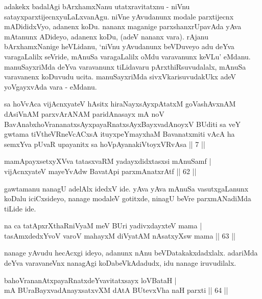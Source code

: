 \begin{artha}
adakekx badalAgi bArxhamxNanu utatxravitatxnu - niVnu 
satayxparxtijecnxyuLaLxvanAgu. niVne yAvudanunx modale parxtijecnx 
mADididxVyo, adanenx koDu. nananx maganige parxshanxrUpavAda yAva 
mAtanunx ADideyo, adanenx koDu, (adeV nananx vara). rAjanu 
bArxhamxNanige heVLidanu, `niVnu yAvudanunx beVDuveyo adu deYva 
varagaLalilx seVride, mAnuSa varagaLalilx oMdu varavanunx keVLu' 
eMdanu. manuSayxriMda deYva varavanunx tiLidavaru pArxthiRsuvudalalx, 
mAnuSa varavanenx koDuvudu ucita. manuSayxriMda sivxVkarisuvudakUkx 
adeV yoVgayxvAda vara - eMdanu.
\end{artha}


\begin{shl}
sa hoVvAca vijAcnxyateV hAsitx hiraNayxsAyxpAtatxM goVashAvxnAM dAsiVnAM parxvArANAM paridAnasayx mA noV BavAnabxhoVrananatxsAyxpayaRnatxsAyxBayxvadAnoyxV BUditi sa veY gwtama tiVtheVRneVcACxsA ituyxpeYmayxhaM Bavanatxmiti vAcA ha semxYva pUvaR upayanitx sa hoVpAyanakiVtoyxVRvAsa || 7 ||
\end{shl}

\begin{shl}
mamApayxsetxyXVva tatasxvaRM yadayxdidxtasxsi mAnuSamf | \\
vijAcnxyateV mayeYvA\s \s dw BavatA\s pi parxmAnatxrAtf \hfill|| 62 || 
\end{shl}

\begin{artha}
gawtamanu nanagU adelAlx idedxV ide. yAva yAva mAnuSa vasutxgaLanunx 
koDalu iciCxsideyo, nanage modaleV gotitxde, ninagU beVre parxmANadiMda 
tiLide ide.
\end{artha}

\begin{shl}
na ca tatApxrXthaRniVyaM meV BUri yadivxdayxteV mama | \\
tasAmxdedxYvoV varoV mahayxM diVyatAM nAsatxyXsw mama \hfill|| 63 || 
\end{shl}

\begin{artha}
nanage yAvudu hecAcxgi ideyo, adanunx nAnu beVDatakakxdadxlalx. adariMda deYva varavaneVnx nanagAgi koDabeVkAdadudx, idu nanage iruvudilalx.
\end{artha}


\begin{shl}
bahoVrananAtxpayaRnatxdeYvavitatxsayx loVBataH | \\
mA BUraBayxvadAnayxsatxvXM dAtA BUtevxVha naH parxti \hfill|| 64 || 
\end{shl}

